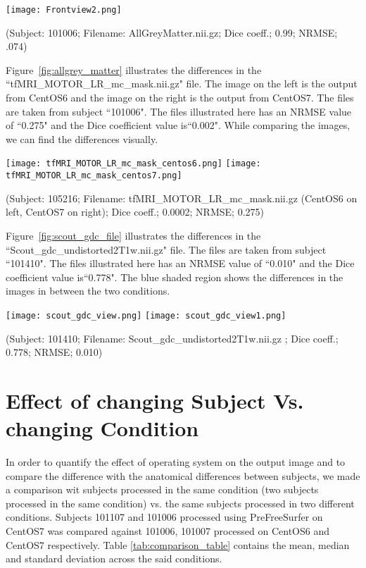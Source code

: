 \hfill \break
\begin{center}
\texttt{[image: Frontview2.png]}%
\caption*{(Subject: 101006; Filename: AllGreyMatter.nii.gz; Dice coeff.; 0.99; NRMSE; .074)}
\label{fig:allgrey_matter} 
\end{center}
\hfill \break

Figure~\ref{fig:allgrey_matter} illustrates the differences in the ``tfMRI\_MOTOR\_LR\_mc\_mask.nii.gz" file. The image on the left is the output from CentOS6 and the image on the right is the output from CentOS7. The files are taken from subject ``101006". The files illustrated here has an NRMSE value of ``0.275" and the Dice coefficient value is``0.002". While comparing the images, we can find the differences visually.

\hfill \break
\begin{center}
\texttt{[image: tfMRI\_MOTOR\_LR\_mc\_mask\_centos6.png]}%
\texttt{[image: tfMRI\_MOTOR\_LR\_mc\_mask\_centos7.png]}
\caption*{(Subject: 105216; Filename: tfMRI\_MOTOR\_LR\_mc\_mask.nii.gz (CentOS6 on left, CentOS7 on right); Dice coeff.; 0.0002; NRMSE; 0.275)}
\label{fig:tfMRI_mask_file}
\end{center}

Figure~\ref{fig:scout_gdc_file} illustrates the differences in the ``Scout\_gdc\_undistorted2T1w.nii.gz" file. The files are taken from subject ``101410". The files illustrated here has an NRMSE value of ``0.010" and the Dice coefficient value is``0.778". The blue shaded region shows the differences in the images in between the two conditions.

\hfill \break
\begin{center}
\texttt{[image: scout\_gdc\_view.png]}%
\texttt{[image: scout\_gdc\_view1.png]}
\caption*{(Subject: 101410; Filename: Scout\_gdc\_undistorted2T1w.nii.gz ; Dice coeff.; 0.778; NRMSE; 0.010)}
\label{fig:scout_gdc_file}
\end{center}

\section{Effect of changing Subject Vs. changing Condition}\label{sec:comparison}
In order to quantify the effect of operating system on the output image and to compare the difference with the anatomical differences between subjects, we made a comparison wit subjects processed in the same condition (two subjects processed in the same condition) vs. the same subjects processed in two different conditions. Subjects 101107 and 101006 processed using PreFreeSurfer on CentOS7 was compared against 101006, 101007 processed on CentOS6 and CentOS7 respectively. Table \ref{tab:comparison_table} contains the mean, median and standard deviation across the said conditions.

